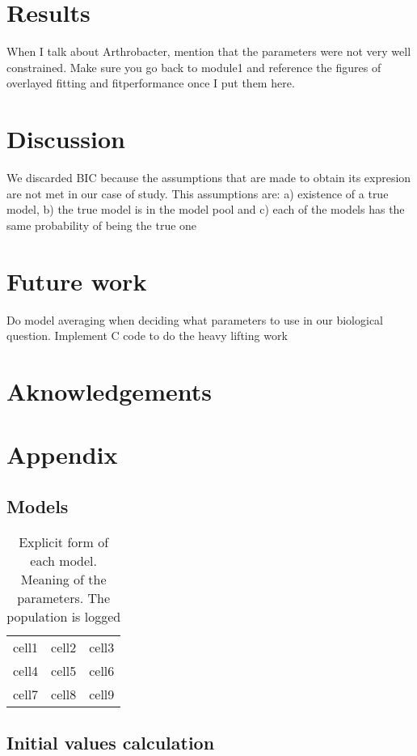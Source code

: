 \documentclass[titlepage,11pt]{article}
\begin{document}
\begin{linenumbers}
	\section{Results}
	When I talk about Arthrobacter, mention that the parameters were not very well constrained.
	Make sure you go back to module1 and reference the figures of overlayed fitting and fitperformance once I put them here.
	
	\section{Discussion}
	We discarded BIC because the assumptions that are made to obtain its expresion are not met in our case of study. This assumptions are: a) existence of a true model, b) the true model is in the model pool and c) each of the  models has the same probability of being the true one 
	
	\section{Future work}
	Do model averaging when deciding what parameters to use in our biological question. Implement C code to do the heavy lifting work
	
	\section{Aknowledgements}
	
	\newpage
	\section{Appendix}
	\subsection{Models}
	\begin{table}[h]
		\centering
		\begin{tabular}{ c c c }
			cell1 & cell2 & cell3 \\ 
			cell4 & cell5 & cell6 \\  
			cell7 & cell8 & cell9    
		\end{tabular}
		\caption{\label{tab:model_eqs}Explicit form of each model. Meaning of the parameters. The population is logged}
	\end{table}
	\subsection{Initial values calculation}\label{sec:initial_values}
	
\end{linenumbers}
\newpage


\end{document}
